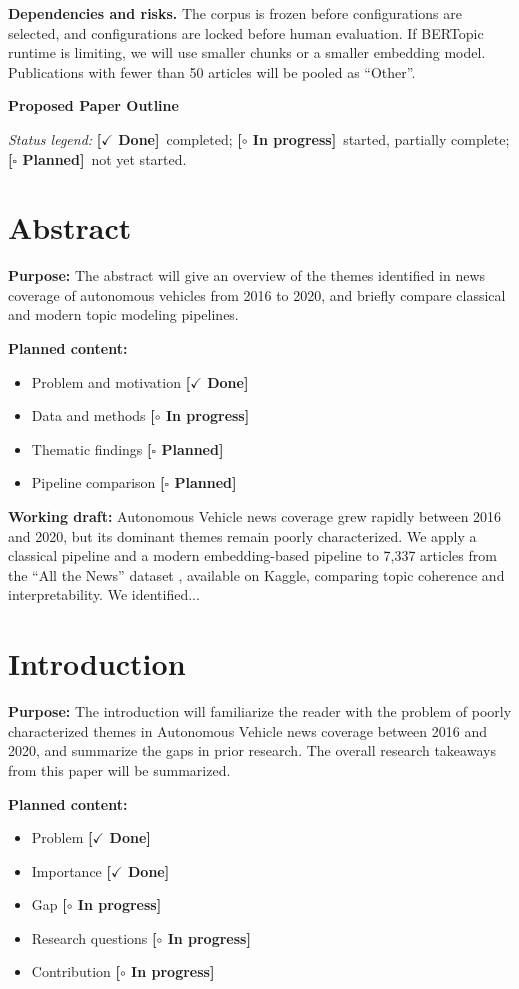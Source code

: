 \documentclass[conference]{IEEEtran}
\newcommand{\done}{\textcolor{green!40!black}{\textbf{[$\checkmark$ Done]}}}
\newcommand{\wip}{\textcolor{orange!70!black}{\textbf{[$\circ$ In progress]}}}
\newcommand{\planned}{\textcolor{blue!60!black}{\textbf{[$\square$ Planned]}}}
\begin{document}
\textbf{Dependencies and risks.} The corpus is frozen before configurations are
selected, and configurations are locked before human evaluation. If BERTopic
runtime is limiting, we will use smaller chunks or a smaller embedding model. Publications
with fewer than 50 articles will be pooled as ``Other''.

\newpage
\begin{center}\large\textbf{Proposed Paper Outline}\end{center}
\noindent\emph{Status legend:} \done~completed;
\wip~started, partially complete; \planned~not yet started.

\section*{Abstract}
\textbf{Purpose:} The abstract will give an overview of the themes identified in news coverage of autonomous vehicles from 2016 to 2020, and briefly compare classical and modern topic modeling pipelines.

\textbf{Planned content:} 
\begin{itemize}
    \item Problem and motivation \done
    \item Data and methods \wip
    \item Thematic findings \planned
    \item Pipeline comparison \planned
\end{itemize}

\textbf{Working draft:}
Autonomous Vehicle news coverage grew rapidly between 2016 and 2020, but its dominant
themes remain poorly characterized. We apply a classical pipeline and a modern embedding-based pipeline to 7,337 articles from the “All the News” dataset \cite{mckinley2021}, available on Kaggle, comparing topic coherence and interpretability. We identified...

\section*{Introduction}
\textbf{Purpose:} The introduction will familiarize the reader with the problem of poorly characterized themes in Autonomous Vehicle news coverage between 2016 and 2020, and summarize the gaps in prior research. The overall research takeaways from this paper will be summarized.

\textbf{Planned content:} 
\begin{itemize}
    \item Problem \done
    \item Importance \done
    \item Gap \wip
    \item Research questions \wip
    \item Contribution \wip
\end{itemize}
\end{document}
